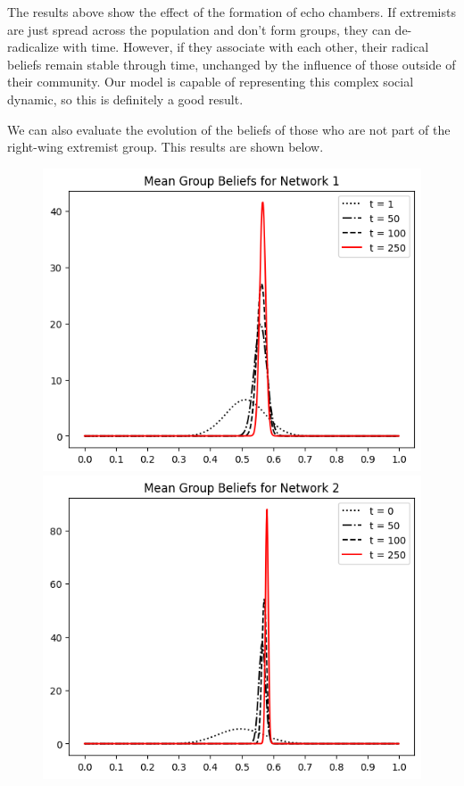 \documentclass[11pt]{article}
\begin{document}
The results above show the effect of the formation of echo chambers. If extremists are just spread across the population and don't form groups, they can de-radicalize with time. However, if they associate with each other, their radical beliefs remain stable through time, unchanged by the influence of those outside of their community. Our model is capable of representing this complex social dynamic, so this is definitely a good result.

We can also evaluate the evolution of the  beliefs of those who are not part of the right-wing extremist group. This results are shown below.

\begin{figure}[h]
    \centering
    \includegraphics[scale=0.5]{images/Mean group beliefs from spread right extremists.png}
    \hspace{1cm}
    \includegraphics[scale=0.5]{images/Mean group beliefs from political party simulation.png}

\end{figure}
\end{document}
